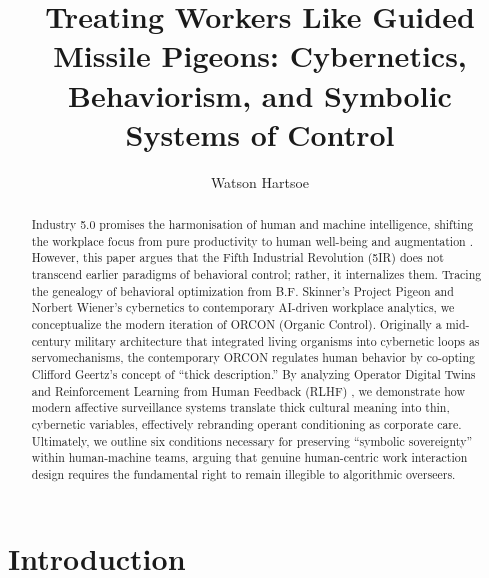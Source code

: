 \documentclass[runningheads]{llncs}
\begin{document}
\title{Treating Workers Like Guided Missile Pigeons: Cybernetics, Behaviorism, and Symbolic Systems of Control}

\author{Watson Hartsoe}

\maketitle

\begin{abstract}
Industry 5.0 promises the harmonisation of human and machine intelligence, shifting the workplace focus from pure productivity to human well-being and augmentation \cite{breque2021industry}. However, this paper argues that the Fifth Industrial Revolution (5IR) does not transcend earlier paradigms of behavioral control; rather, it internalizes them. Tracing the genealogy of behavioral optimization from B.F. Skinner's Project Pigeon and Norbert Wiener's cybernetics to contemporary AI-driven workplace analytics, we conceptualize the modern iteration of ORCON (Organic Control). Originally a mid-century military architecture that integrated living organisms into cybernetic loops as servomechanisms, the contemporary ORCON regulates human behavior by co-opting Clifford Geertz's concept of ``thick description.'' By analyzing Operator Digital Twins and Reinforcement Learning from Human Feedback (RLHF) \cite{christiano2017preferences,ouyang2022training,sutton2018reinforcement}, we demonstrate how modern affective surveillance systems translate thick cultural meaning into thin, cybernetic variables, effectively rebranding operant conditioning as corporate care. Ultimately, we outline six conditions necessary for preserving ``symbolic sovereignty'' within human-machine teams, arguing that genuine human-centric work interaction design requires the fundamental right to remain illegible to algorithmic overseers.

\end{abstract}

\section{Introduction}
\end{document}
